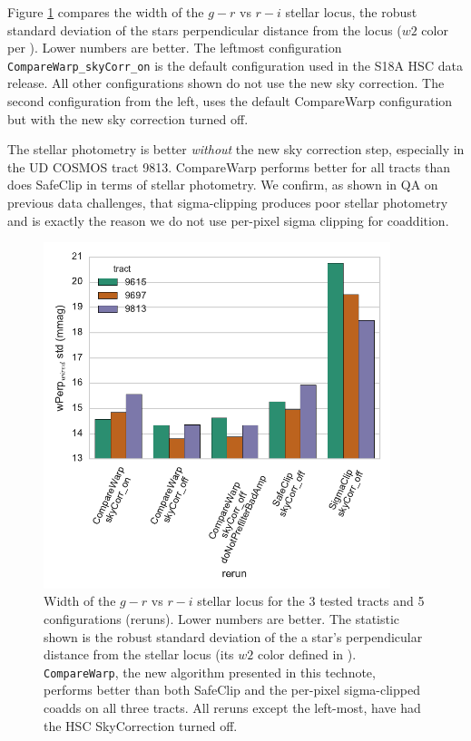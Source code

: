 \documentclass[DM,authoryear,toc]{lsstdoc}
\begin{document}
Figure \ref{fig:w_std_fit} compares the width of the $g-r$ vs $r-i$ stellar locus,  the robust standard deviation of the stars perpendicular distance from the locus ($w2$ color per \cite{2004AN....325..583I}).
Lower numbers are better.
The leftmost configuration \texttt{CompareWarp\_skyCorr\_on} is the default configuration used in the S18A HSC data release.
All other configurations shown do not use the new sky correction.
The second configuration from the left, uses the default CompareWarp configuration but with the new sky correction turned off.

The stellar photometry is better \emph{without} the new sky correction step, especially in the UD COSMOS tract 9813.
CompareWarp performs better for all tracts than does SafeClip in terms of stellar photometry.
We confirm, as shown in QA on previous data challenges, that sigma-clipping produces poor stellar photometry and is exactly the reason we do not use per-pixel sigma clipping for coaddition.

\begin{figure}
\begin{centering}
\includegraphics[width=0.9\textwidth]{figures/w_std_fit.pdf}
\par\end{centering}
\caption{\label{fig:w_std_fit} Width of the $g-r$ vs $r-i$ stellar locus for the 3 tested tracts and 5 configurations (reruns). Lower numbers are better. The statistic shown is the robust standard deviation of the a star's perpendicular distance from the stellar locus (its $w2$ color defined in \cite{2004AN....325..583I}). \texttt{CompareWarp}, the new algorithm presented in this technote, performs better than both SafeClip and the per-pixel sigma-clipped coadds on all three tracts. All reruns except the left-most, have had the HSC SkyCorrection turned off. }
\end{figure}
\end{document}
